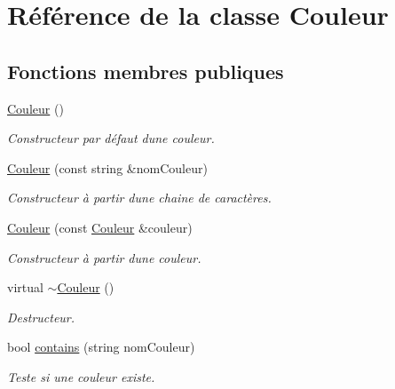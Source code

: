 \hypertarget{class_couleur}{}\section{Référence de la classe Couleur}
\label{class_couleur}
\subsection*{Fonctions membres publiques}
\begin{DoxyCompactItemize}
\item 
\mbox{\label{class_couleur_a687a457edb08b51dbcd0299bb0b6a882}} 
\mbox{\hyperlink{class_couleur_a687a457edb08b51dbcd0299bb0b6a882}{Couleur}} ()
\begin{DoxyCompactList}\small\item\em Constructeur par défaut d\textquotesingle{}une couleur. \end{DoxyCompactList}\item 
\mbox{\hyperlink{class_couleur_a3875e178605e5a425a473b9034f796b3}{Couleur}} (const string \&nom\+Couleur)
\begin{DoxyCompactList}\small\item\em Constructeur à partir d\textquotesingle{}une chaine de caractères. \end{DoxyCompactList}\item 
\mbox{\hyperlink{class_couleur_ae5694f3994756524981394433bbdc85f}{Couleur}} (const \mbox{\hyperlink{class_couleur}{Couleur}} \&couleur)
\begin{DoxyCompactList}\small\item\em Constructeur à partir d\textquotesingle{}une couleur. \end{DoxyCompactList}\item 
\mbox{\label{class_couleur_ad3be30be83649bc5db48ef46b592aec2}} 
virtual \mbox{\hyperlink{class_couleur_ad3be30be83649bc5db48ef46b592aec2}{$\sim$\+Couleur}} ()
\begin{DoxyCompactList}\small\item\em Destructeur. \end{DoxyCompactList}\item 
bool \mbox{\hyperlink{class_couleur_ab426fe44e27a92cf0faf8fee1e086a5f}{contains}} (string nom\+Couleur)
\begin{DoxyCompactList}\small\item\em Teste si une couleur existe. \end{DoxyCompactList}\item 

\end{DoxyCompactItemize}
